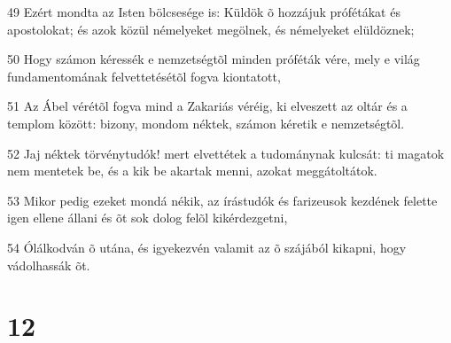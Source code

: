 \par 49 Ezért mondta az Isten bölcsesége is: Küldök õ hozzájuk prófétákat és apostolokat; és azok közül némelyeket megölnek, és némelyeket elüldöznek;
\par 50 Hogy számon kéressék e nemzetségtõl minden próféták vére, mely e világ fundamentomának felvettetésétõl fogva kiontatott,
\par 51 Az Ábel vérétõl fogva mind a Zakariás  véréig, ki elveszett az oltár és a templom között: bizony, mondom néktek, számon kéretik e nemzetségtõl.
\par 52 Jaj néktek törvénytudók! mert elvettétek a tudománynak kulcsát: ti magatok nem mentetek be, és a kik be akartak menni, azokat meggátoltátok.
\par 53 Mikor pedig ezeket mondá nékik, az írástudók és farizeusok kezdének felette igen ellene állani és õt sok dolog felõl kikérdezgetni,
\par 54 Ólálkodván õ utána, és igyekezvén valamit az õ szájából kikapni, hogy vádolhassák õt.

\chapter{12}

